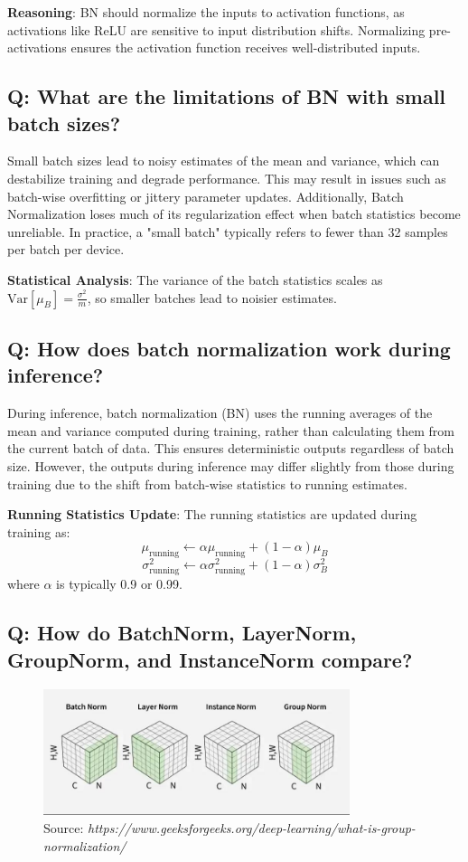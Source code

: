 \textbf{Reasoning}: BN should normalize the inputs to activation functions, as activations like ReLU are sensitive to input distribution shifts. Normalizing pre-activations ensures the activation function receives well-distributed inputs.

\subsection*{\textcolor{primaryteal}{Q: What are the limitations of BN with small batch sizes?}}
Small batch sizes lead to noisy estimates of the mean and variance, which can destabilize training and degrade performance. This may result in issues such as batch-wise overfitting or jittery parameter updates. Additionally, Batch Normalization loses much of its regularization effect when batch statistics become unreliable. In practice, a "small batch" typically refers to fewer than 32 samples per batch per device.

\textbf{Statistical Analysis}: The variance of the batch statistics scales as $\text{Var}[\mu_B] = \frac{\sigma^2}{m}$, so smaller batches lead to noisier estimates.

\subsection*{\textcolor{primaryteal}{Q: How does batch normalization work during inference?}}
During inference, batch normalization (BN) uses the running averages of the mean and variance computed during training, rather than calculating them from the current batch of data. This ensures deterministic outputs regardless of batch size. However, the outputs during inference may differ slightly from those during training due to the shift from batch-wise statistics to running estimates.

\textbf{Running Statistics Update}: The running statistics are updated during training as:
\[
\mu_{\text{running}} \leftarrow \alpha \mu_{\text{running}} + (1-\alpha) \mu_B
\]
\[
\sigma^2_{\text{running}} \leftarrow \alpha \sigma^2_{\text{running}} + (1-\alpha) \sigma^2_B
\]
where $\alpha$ is typically 0.9 or 0.99.

\subsection*{\textcolor{primaryteal}{Q: How do BatchNorm, LayerNorm, GroupNorm, and InstanceNorm compare?}}
\begin{figure}[H]
	\centering
	\includegraphics[width=0.8\textwidth]{norms.jpg}
	\caption{Source: \textit{https://www.geeksforgeeks.org/deep-learning/what-is-group-normalization/}}
\end{figure}

